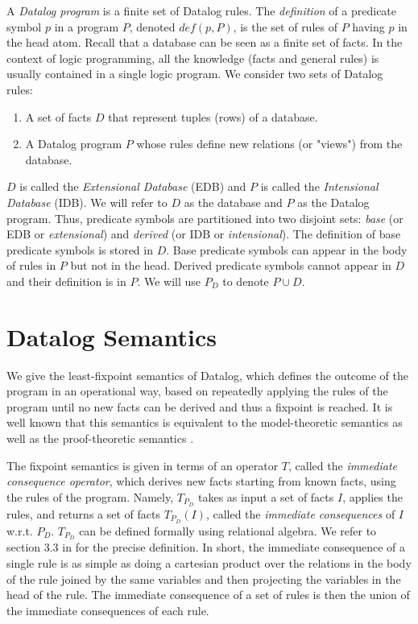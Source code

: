 \documentclass[11pt]{report}
\theoremstyle{definition}
\begin{document}
A \textit{Datalog program} is a finite set of Datalog rules. The \textit{definition} of a predicate symbol $p$ in a program $P$, denoted $def(p, P)$, is the set of rules of $P$ having $p$ in the head atom. Recall that a database can be seen as a finite set of facts. In the context of logic programming, all the knowledge (facts and general rules) is usually contained in a single logic program. We consider two sets of Datalog rules:
\begin{enumerate}
  \item A set of facts $D$ that represent tuples (rows) of a database.
  \item A Datalog program $P$ whose rules define new relations (or "views") from the database.
\end{enumerate}
$D$ is called the \textit{Extensional Database} (EDB) and $P$ is called the \textit{Intensional Database} (IDB). We will refer to $D$ as the database and $P$ as the Datalog program. Thus, predicate symbols are partitioned into two disjoint sets: \textit{base} (or EDB or \textit{extensional}) and \textit{derived} (or IDB or \textit{intensional}). The definition of base predicate symbols is stored in $D$. Base predicate symbols can appear in the body of rules in $P$ but not in the head. Derived predicate symbols cannot appear in $D$ and their definition is in $P$. We will use $P_D$ to denote $P \cup D$.

\section{Datalog Semantics}
We give the least-fixpoint semantics of Datalog, which defines the outcome of the program in an operational way, based on repeatedly applying the rules of the program until no new facts can be derived and thus a fixpoint is reached. It is well known that this semantics is equivalent to the model-theoretic semantics as well as the proof-theoretic semantics \cite{10.5555/551350}.

The fixpoint semantics is given in terms of an operator $T$, called the \textit{immediate consequence operator}, which derives new facts starting from known facts, using the rules of the program. Namely, $T_{P_D}$ takes as input a set of facts $I$, applies the rules, and returns a set of facts $T_{P_D}(I)$, called the \textit{immediate consequences} of $I$ w.r.t. $P_D$. $T_{P_D}$ can be defined formally using relational algebra. We refer to section 3.3 in \cite{greco_datalog_2016} for the precise definition. In short, the immediate consequence of a single rule is as simple as doing a cartesian product over the relations in the body of the rule joined by the same variables and then projecting the variables in the head of the rule. The immediate consequence of a set of rules is then the union of the immediate consequences of each rule.
\end{document}
